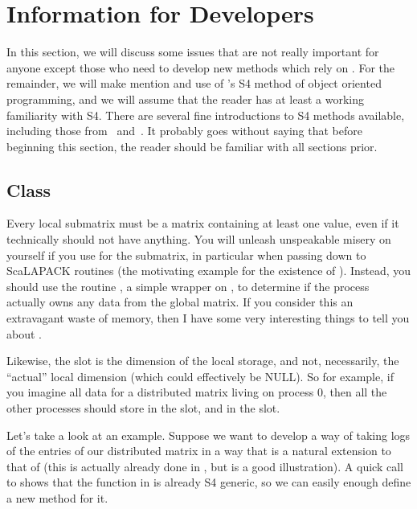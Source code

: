 \section[]{Information for Developers}
\label{sec:devs}

In this section, we will discuss some issues that are not really important for anyone except those who need to develop new methods which rely on .  For the remainder, we will make mention and use of 's S4 method of object oriented programming, and we will assume that the reader has at least a working familiarity with S4.  There are several fine introductions to S4 methods available, including those from~\citep{s4chambers} and~\citep{s4notsoshort}.  It probably goes without saying that before beginning this section, the reader should be familiar with all sections prior.

\subsection[]{Class }
\label{sec:ictxt}

Every local submatrix must be a matrix containing at least one value, even if it technically should not have anything.  You will unleash unspeakable misery on yourself if you use  for the submatrix, in particular when passing down to ScaLAPACK routines (the motivating example for the existence of ).  Instead, you should use the routine , a simple wrapper on , to determine if the process actually owns any data from the global matrix.  If you consider this an extravagant waste of memory, then I have some very interesting things to tell you about .

Likewise, the slot  is the dimension of the local storage, and not, necessarily, the ``actual'' local dimension (which could effectively be NULL).  So for example, if you imagine all data for a distributed matrix living on process 0, then all the other processes should store  in the  slot, and  in the  slot.

Let's take a look at an example.  Suppose we want to develop a way of taking logs of the entries of our distributed matrix in a way that is a natural extension to that of  (this is actually already done in , but is a good illustration).  A quick call to  shows that the function  in  is already S4 generic, so we can easily enough define a new method for it.

